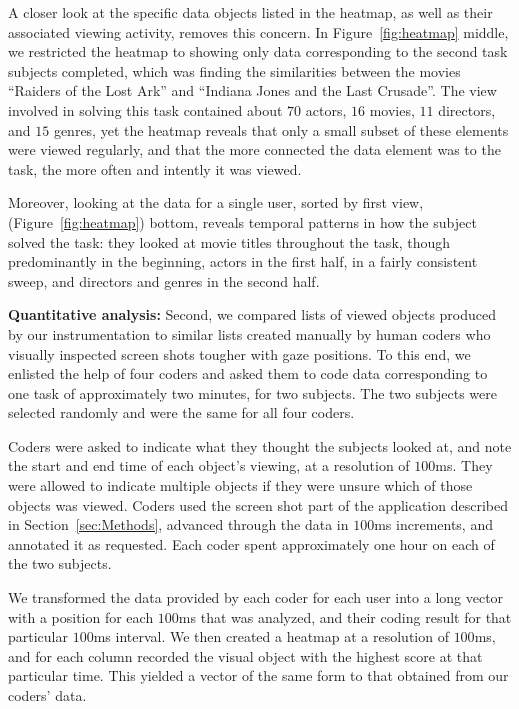 A closer look at the specific data objects listed in the heatmap, as well as their associated viewing activity, removes this concern. In Figure~\ref{fig:heatmap} middle, we restricted the heatmap to showing only data corresponding to the second task subjects completed, which was finding the similarities between the movies ``Raiders of the Lost Ark'' and ``Indiana Jones and the Last Crusade''. The view involved in solving this task contained about $70$ actors, $16$ movies, $11$ directors, and $15$ genres, yet the heatmap reveals that only a small subset of these elements were viewed regularly, and that the more connected the data element was to the task, the more often and intently it was viewed.

Moreover, looking at the data for a single user, sorted by first view, (Figure~\ref{fig:heatmap}) bottom, reveals temporal patterns in how the subject solved the task: they looked at movie titles throughout the task, though predominantly in the beginning, actors in the first half, in a fairly consistent sweep, and directors and genres in the second half. 

\textbf{Quantitative analysis:} Second, we compared lists of viewed objects produced by our instrumentation to similar lists created manually by human coders who visually inspected screen shots tougher with gaze positions. To this end, we enlisted the help of four coders and asked them to code data corresponding to one task of approximately two minutes, for two subjects. The two subjects were selected randomly and were the same for all four coders. 

Coders were asked to indicate what they thought the subjects looked at, and note the start and end time of each object's viewing, at a resolution of $100$ms. They were allowed to indicate multiple objects if they were unsure which of those objects was viewed. Coders used the screen shot part of the application described in Section~\ref{sec:Methods}, advanced through the data in $100$ms increments, and annotated it as requested. Each coder spent approximately one hour on each of the two subjects.

We transformed the data provided by each coder for each user into a long vector with a position for each $100$ms that was analyzed, and their coding result for that particular $100$ms interval. We then created a heatmap at a resolution of $100$ms, and for each column recorded the visual object with the highest score at that particular time. This yielded a vector of the same form to that obtained from our coders' data.  

